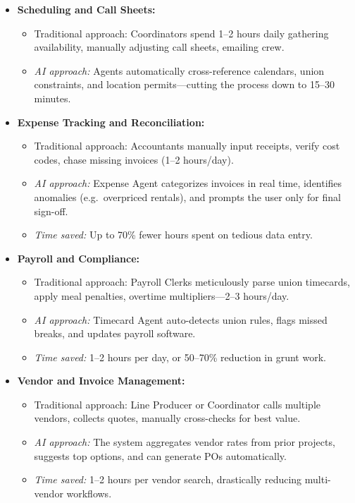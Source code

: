 \documentclass[11pt]{article}
\begin{document}
\begin{itemize}
    \item \textbf{Scheduling and Call Sheets:}
    \begin{itemize}
        \item Traditional approach: Coordinators spend 1--2 hours daily gathering availability, manually adjusting call sheets, emailing crew.
        \item \emph{AI approach:} Agents automatically cross-reference calendars, union constraints, and location permits—cutting the process down to 15--30 minutes.
    \end{itemize}

    \item \textbf{Expense Tracking and Reconciliation:}
    \begin{itemize}
        \item Traditional approach: Accountants manually input receipts, verify cost codes, chase missing invoices (1--2 hours/day).
        \item \emph{AI approach:} Expense Agent categorizes invoices in real time, identifies anomalies (e.g.\ overpriced rentals), and prompts the user only for final sign-off.
        \item \emph{Time saved:} Up to 70\% fewer hours spent on tedious data entry.
    \end{itemize}

    \item \textbf{Payroll and Compliance:}
    \begin{itemize}
        \item Traditional approach: Payroll Clerks meticulously parse union timecards, apply meal penalties, overtime multipliers—2--3 hours/day.
        \item \emph{AI approach:} Timecard Agent auto-detects union rules, flags missed breaks, and updates payroll software.
        \item \emph{Time saved:} 1--2 hours per day, or 50--70\% reduction in grunt work.
    \end{itemize}

    \item \textbf{Vendor and Invoice Management:}
    \begin{itemize}
        \item Traditional approach: Line Producer or Coordinator calls multiple vendors, collects quotes, manually cross-checks for best value.
        \item \emph{AI approach:} The system aggregates vendor rates from prior projects, suggests top options, and can generate POs automatically.
        \item \emph{Time saved:} 1--2 hours per vendor search, drastically reducing multi-vendor workflows.
    \end{itemize}


\end{itemize}
\end{document}
